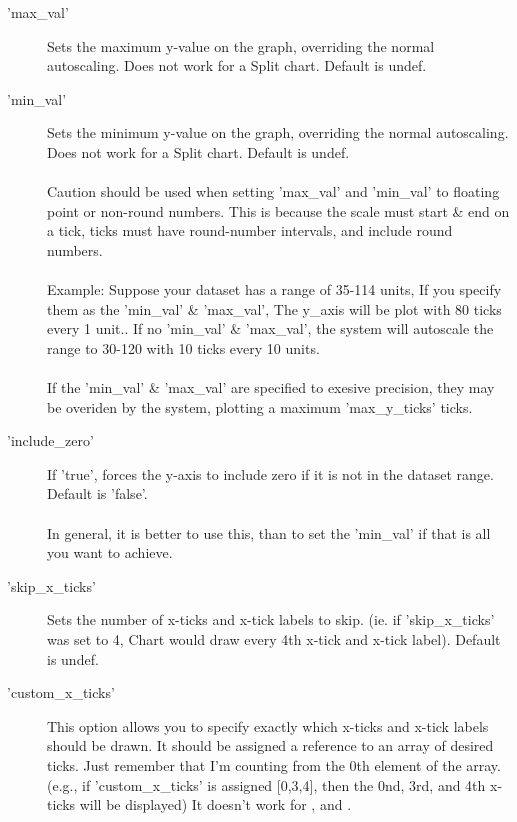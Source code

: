 \begin{description}
\item['max\_val']Sets the maximum y-value on the graph, overriding the normal autoscaling.  
            Does not work for a Split chart. Default is undef.

\item['min\_val']Sets the minimum y-value on the graph, overriding the normal autoscaling.  
           Does not work for a Split chart. Default is undef.\\
\\
Caution should be used when setting 'max\_val' and 'min\_val' to floating point or non-round numbers. This is because the scale must start \& end on a tick, ticks must have round-number intervals, and include round numbers.\\
\\
Example: Suppose your dataset has a range of 35-114 units, If you specify them as the 'min\_val' \& 'max\_val', The y\_axis will be plot with 80 ticks every 1 unit.. If no 'min\_val' \& 'max\_val', the system will autoscale the range to 30-120 with 10 ticks every 10 units.\\
\\
If the 'min\_val' \& 'max\_val' are specified to exesive precision, they may be overiden by the system, plotting a maximum 'max\_y\_ticks' ticks. 

\item['include\_zero']If 'true', forces the y-axis to include zero if it is not in the 
            dataset range. Default is 'false'.\\
\\
In general, it is better to use this, than to set the 'min\_val' if that is all you want to achieve.
\item['skip\_x\_ticks']Sets the number of x-ticks and x-tick labels to skip.  (ie. if 'skip\_x\_ticks' was set to 4, Chart would draw every 4th x-tick and x-tick label).  Default is undef.

\item['custom\_x\_ticks']This option allows you to specify exactly 
            which x-ticks and x-tick labels should be drawn. 
            It should be assigned a reference to an array of desired ticks.  
            Just remember that I'm counting from the 0th element of the array.  
            (e.g., if 'custom\_x\_ticks' is assigned [0,3,4], 
            then the 0nd, 3rd, and 4th x-ticks will be displayed) 
            It doesn't work for ,  and .
            

\end{description}
